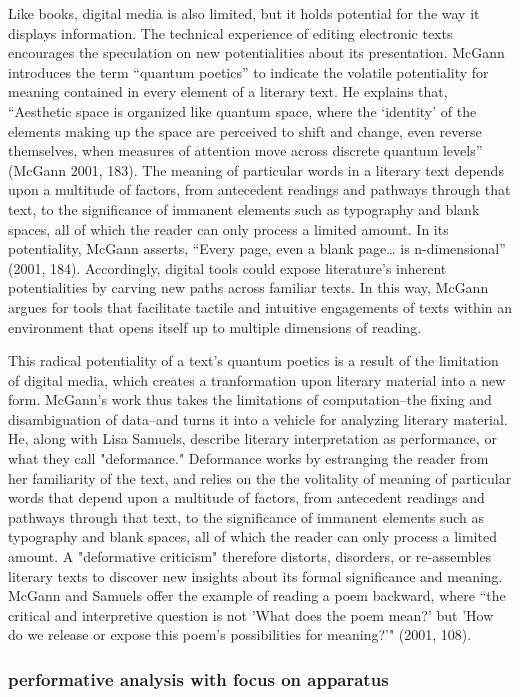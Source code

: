 \documentclass[11pt]{article}
\begin{document}
Like books, digital media is also limited, but it holds potential for
the way it displays information. The technical experience of editing
electronic texts encourages the speculation on new potentialities
about its presentation. McGann introduces the term “quantum poetics”
to indicate the volatile potentiality for meaning contained in every
element of a literary text. He explains that, “Aesthetic space is
organized like quantum space, where the ‘identity’ of the elements
making up the space are perceived to shift and change, even reverse
themselves, when measures of attention move across discrete quantum
levels” (McGann 2001, 183). The meaning of particular words in a
literary text depends upon a multitude of factors, from antecedent
readings and pathways through that text, to the significance of
immanent elements such as typography and blank spaces, all of which
the reader can only process a limited amount. In its potentiality,
McGann asserts, “Every page, even a blank page\ldots{} is n-dimensional”
(2001, 184). Accordingly, digital tools could expose literature’s
inherent potentialities by carving new paths across familiar texts. In
this way, McGann argues for tools that facilitate tactile and
intuitive engagements of texts within an environment that opens itself
up to multiple dimensions of reading.

This radical potentiality of a text's quantum poetics is a result of
the limitation of digital media, which creates a tranformation upon
literary material into a new form. McGann's work thus takes the
limitations of computation--the fixing and disambiguation of data--and
turns it into a vehicle for analyzing literary material. He, along
with Lisa Samuels, describe literary interpretation as performance, or
what they call "deformance." Deformance works by estranging the reader
from her familiarity of the text, and relies on the the volitality of
meaning of particular words that depend upon a multitude of factors,
from antecedent readings and pathways through that text, to the
significance of immanent elements such as typography and blank spaces,
all of which the reader can only process a limited amount. A
"deformative criticism" therefore distorts, disorders, or re-assembles
literary texts to discover new insights about its formal significance
and meaning. McGann and Samuels offer the example of reading a poem
backward, where “the critical and interpretive question is not 'What
does the poem mean?' but 'How do we release or expose this poem’s
possibilities for meaning?'" (2001, 108).
\subsubsection{performative analysis with focus on apparatus}
\label{sec:orge99d134}
\end{document}
